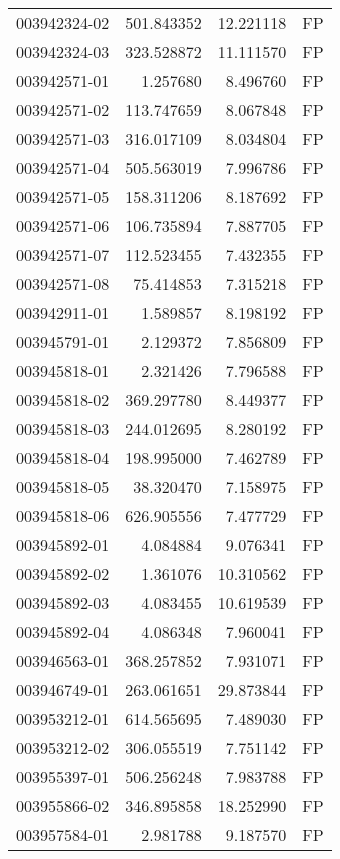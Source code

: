 \begin{tabular}{lrrl}
003942324-02 &  501.843352 &    12.221118 &   FP \\
003942324-03 &  323.528872 &    11.111570 &   FP \\
003942571-01 &    1.257680 &     8.496760 &   FP \\
003942571-02 &  113.747659 &     8.067848 &   FP \\
003942571-03 &  316.017109 &     8.034804 &   FP \\
003942571-04 &  505.563019 &     7.996786 &   FP \\
003942571-05 &  158.311206 &     8.187692 &   FP \\
003942571-06 &  106.735894 &     7.887705 &   FP \\
003942571-07 &  112.523455 &     7.432355 &   FP \\
003942571-08 &   75.414853 &     7.315218 &   FP \\
003942911-01 &    1.589857 &     8.198192 &   FP \\
003945791-01 &    2.129372 &     7.856809 &   FP \\
003945818-01 &    2.321426 &     7.796588 &   FP \\
003945818-02 &  369.297780 &     8.449377 &   FP \\
003945818-03 &  244.012695 &     8.280192 &   FP \\
003945818-04 &  198.995000 &     7.462789 &   FP \\
003945818-05 &   38.320470 &     7.158975 &   FP \\
003945818-06 &  626.905556 &     7.477729 &   FP \\
003945892-01 &    4.084884 &     9.076341 &   FP \\
003945892-02 &    1.361076 &    10.310562 &   FP \\
003945892-03 &    4.083455 &    10.619539 &   FP \\
003945892-04 &    4.086348 &     7.960041 &   FP \\
003946563-01 &  368.257852 &     7.931071 &   FP \\
003946749-01 &  263.061651 &    29.873844 &   FP \\
003953212-01 &  614.565695 &     7.489030 &   FP \\
003953212-02 &  306.055519 &     7.751142 &   FP \\
003955397-01 &  506.256248 &     7.983788 &   FP \\
003955866-02 &  346.895858 &    18.252990 &   FP \\
003957584-01 &    2.981788 &     9.187570 &   FP \\

\end{tabular}
